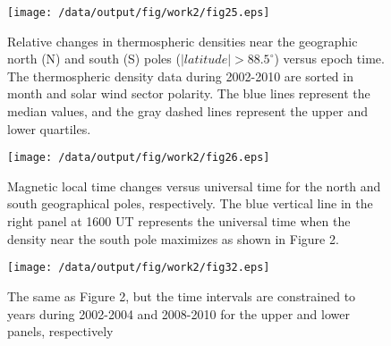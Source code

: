 \documentclass[draft,grl]{/home/gdj/文档/template/agu_template/AGUTeX}
\begin{document}
\begin{figure}
    \centering
    \noindent\texttt{[image: /data/output/fig/work2/fig25.eps]}
    \caption{Relative changes in thermospheric densities near the geographic north (N) and south (S) poles ($\left|latitude\right| > 88.5^\circ$) versus epoch time. The thermospheric density data during 2002-2010 are sorted in month and solar wind sector polarity. The blue lines represent the median values, and the gray dashed lines represent the upper and lower quartiles.}
    \label{figure2}
\end{figure}
\begin{figure}
    \centering
    \noindent\texttt{[image: /data/output/fig/work2/fig26.eps]}
    \caption{ Magnetic local time changes versus universal time for the north and south geographical poles, respectively. The blue vertical line in the right panel at 1600 UT represents the universal time when the density near the south pole maximizes as shown in Figure 2.}
    \label{figure3}
\end{figure}
\begin{figure}
    \centering
    \noindent\texttt{[image: /data/output/fig/work2/fig32.eps]}
    \caption{The same as Figure 2, but the time intervals are constrained to years during 2002-2004 and 2008-2010 for the upper and lower panels, respectively}
    \label{figure4}
\end{figure}

\end{document}
